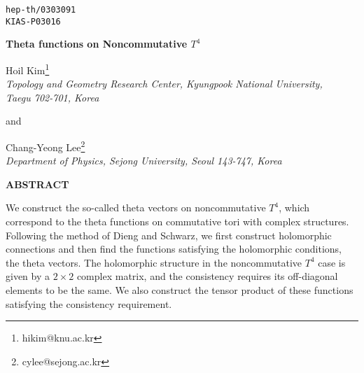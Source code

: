 \documentclass[12pt, a4paper]{article}
\begin{document}
\topmargin -2pt


\headheight 0pt

\topskip 0mm \addtolength{\baselineskip}{0.20\baselineskip}
\begin{flushright}
{\tt hep-th/0303091} \\
{\tt KIAS-P03016}
\end{flushright}

\vspace{10mm}


\begin{center}
{\large \bf   Theta functions on Noncommutative $T^4$ }\\

\vspace{9mm}

{\sc Hoil Kim}\footnote{hikim@knu.ac.kr}\\

{\it Topology and Geometry Research Center, Kyungpook National University,\\
Taegu 702-701, Korea}\\

\vspace{3mm}

and \\

\vspace{3mm}

{\sc Chang-Yeong Lee}\footnote{cylee@sejong.ac.kr}\\
{\it Department of Physics, Sejong University, Seoul 143-747, Korea}\\

\vspace{18mm}


\end{center}


\begin{center}
{\bf ABSTRACT}
\end{center}
We construct the so-called theta vectors on noncommutative $T^4$,
which correspond to the theta functions on commutative tori with
complex structures. Following the method of Dieng and Schwarz, we
first construct holomorphic connections and then find the
functions satisfying the holomorphic conditions, the theta
vectors. The holomorphic structure in the noncommutative $T^4$
case is given by a $2 \times 2$ complex matrix, and the
consistency requires its off-diagonal elements to be the same. We
also construct the tensor product of these functions
satisfying the consistency requirement.\\
\end{document}
